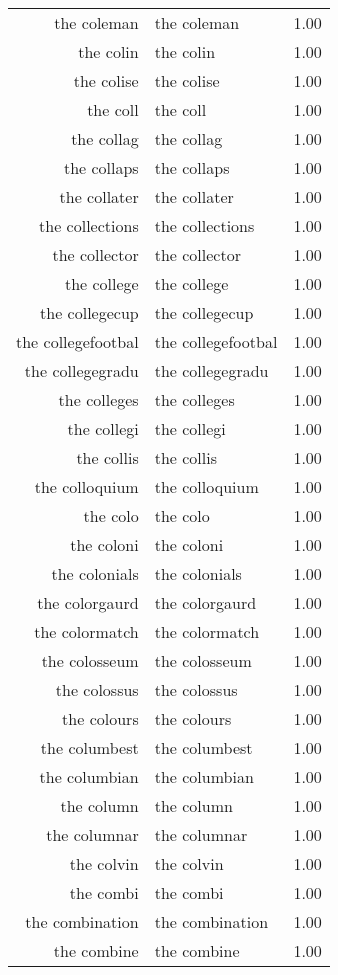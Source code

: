 \begin{table}[ht]
\begin{tabular}{rlr}
  the coleman & the coleman & 1.00 \\ 
  the colin & the colin & 1.00 \\ 
  the colise & the colise & 1.00 \\ 
  the coll & the coll & 1.00 \\ 
  the collag & the collag & 1.00 \\ 
  the collaps & the collaps & 1.00 \\ 
  the collater & the collater & 1.00 \\ 
  the collections & the collections & 1.00 \\ 
  the collector & the collector & 1.00 \\ 
  the college & the college & 1.00 \\ 
  the collegecup & the collegecup & 1.00 \\ 
  the collegefootbal & the collegefootbal & 1.00 \\ 
  the collegegradu & the collegegradu & 1.00 \\ 
  the colleges & the colleges & 1.00 \\ 
  the collegi & the collegi & 1.00 \\ 
  the collis & the collis & 1.00 \\ 
  the colloquium & the colloquium & 1.00 \\ 
  the colo & the colo & 1.00 \\ 
  the coloni & the coloni & 1.00 \\ 
  the colonials & the colonials & 1.00 \\ 
  the colorgaurd & the colorgaurd & 1.00 \\ 
  the colormatch & the colormatch & 1.00 \\ 
  the colosseum & the colosseum & 1.00 \\ 
  the colossus & the colossus & 1.00 \\ 
  the colours & the colours & 1.00 \\ 
  the columbest & the columbest & 1.00 \\ 
  the columbian & the columbian & 1.00 \\ 
  the column & the column & 1.00 \\ 
  the columnar & the columnar & 1.00 \\ 
  the colvin & the colvin & 1.00 \\ 
  the combi & the combi & 1.00 \\ 
  the combination & the combination & 1.00 \\ 
  the combine & the combine & 1.00 \\ 

\end{tabular}
\end{table}
